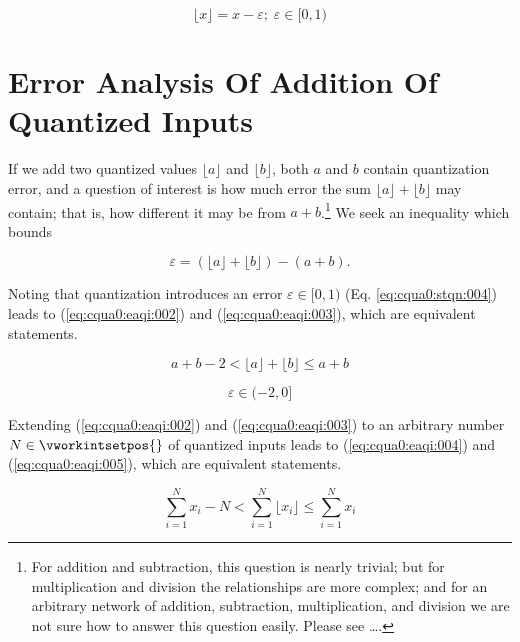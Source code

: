 \begin{equation}
\label{eq:cqua0:smoq:004}
\lfloor x \rfloor = x - \varepsilon{}; \; \varepsilon \in [0,1)
\end{equation}


\section{Error Analysis Of Addition Of Quantized Inputs}

If we add two quantized values $\lfloor a \rfloor$ and
$\lfloor b \rfloor$, both $a$ and $b$ contain quantization
error, and a question of interest is how much
error the sum $\lfloor a \rfloor + \lfloor b \rfloor$ may
contain; that is, how different it may be from $a+b$.\footnote{For
addition and subtraction, this question is nearly trivial; but for
multiplication and division the relationships are more complex; and for
an arbitrary network of addition, subtraction, multiplication, and
division we are not sure how to answer this question easily.
Please see \ldots{}.}
We seek an inequality which bounds

\begin{equation}
\label{eq:cqua0:eaqi:001}
\varepsilon{} = \left( {\lfloor a \rfloor + \lfloor b \rfloor} \right)
                      - \left( {a + b} \right)  .
\end{equation}

Noting that quantization introduces an error $\varepsilon \in [0,1)$
(Eq. \ref{eq:cqua0:stqn:004}) leads to
(\ref{eq:cqua0:eaqi:002}) and (\ref{eq:cqua0:eaqi:003}), which are equivalent statements.

\begin{equation}
\label{eq:cqua0:eaqi:002}
a + b - 2 < \lfloor a \rfloor + \lfloor b \rfloor \leq a + b
\end{equation}

\begin{equation}
\label{eq:cqua0:eaqi:003}
\varepsilon \in (-2,0]
\end{equation}

Extending (\ref{eq:cqua0:eaqi:002}) and (\ref{eq:cqua0:eaqi:003})
to an arbitrary number $N \in \vworkintsetpos{}$ of quantized inputs leads to
(\ref{eq:cqua0:eaqi:004}) and (\ref{eq:cqua0:eaqi:005}),
which are equivalent statements.

\begin{equation}
\label{eq:cqua0:eaqi:004}
\sum_{i=1}^{N} x_i - N < \sum_{i=1}^{N} \lfloor x_i \rfloor \leq \sum_{i=1}^{N} x_i
\end{equation}


